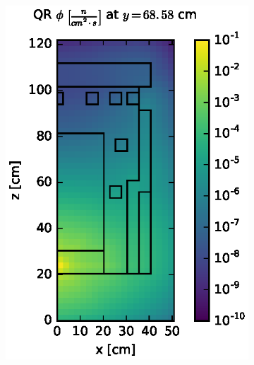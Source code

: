 \documentclass{article} %
\begin{document}
\begin{figure}[!htb]
\centering
\begin{subfigure}{0.4\textwidth}
\includegraphics[max height=0.445\textheight]
{img/dlvn-fwd-flux-qr04.eps}
\end{subfigure} ~
\begin{subfigure}{0.4\textwidth}

\end{subfigure}
\end{figure}
\end{document}
